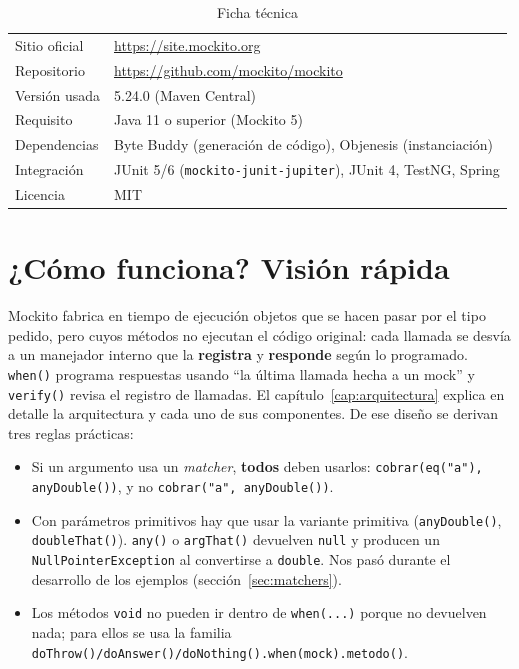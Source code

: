 \documentclass[11pt,a4paper,oneside]{report}
\newcommand{\code}[1]{\texttt{#1}}
\begin{document}
\begin{table}[H]
\centering
\caption{Ficha técnica}
\begin{tabular}{ll}
\toprule
Sitio oficial & \url{https://site.mockito.org}\\
Repositorio & \url{https://github.com/mockito/mockito}\\
Versión usada & 5.24.0 (Maven Central)\\
Requisito & Java 11 o superior (Mockito 5)\\
Dependencias & Byte Buddy (generación de código), Objenesis (instanciación)\\
Integración & JUnit 5/6 (\code{mockito-junit-jupiter}), JUnit 4, TestNG, Spring\\
Licencia & MIT\\
\bottomrule
\end{tabular}
\end{table}

\section{¿Cómo funciona? Visión rápida}
Mockito fabrica en tiempo de ejecución objetos que se hacen pasar por el tipo pedido, pero cuyos métodos no ejecutan el código original: cada llamada se desvía a un manejador interno que la \textbf{registra} y \textbf{responde} según lo programado. \code{when()} programa respuestas usando ``la última llamada hecha a un mock'' y \code{verify()} revisa el registro de llamadas. El capítulo~\ref{cap:arquitectura} explica en detalle la arquitectura y cada uno de sus componentes. De ese diseño se derivan tres reglas prácticas:

\begin{atencion}
\begin{itemize}
  \item Si un argumento usa un \emph{matcher}, \textbf{todos} deben usarlos: \code{cobrar(eq("a"), anyDouble())}, y no \code{cobrar("a", anyDouble())}.
  \item Con parámetros primitivos hay que usar la variante primitiva (\code{anyDouble()}, \code{doubleThat()}). \code{any()} o \code{argThat()} devuelven \code{null} y producen un \code{NullPointerException} al convertirse a \code{double}. Nos pasó durante el desarrollo de los ejemplos (sección~\ref{sec:matchers}).
  \item Los métodos \code{void} no pueden ir dentro de \code{when(...)} porque no devuelven nada; para ellos se usa la familia \code{doThrow()/doAnswer()/doNothing().when(mock).metodo()}.
\end{itemize}
\end{atencion}
\end{document}
